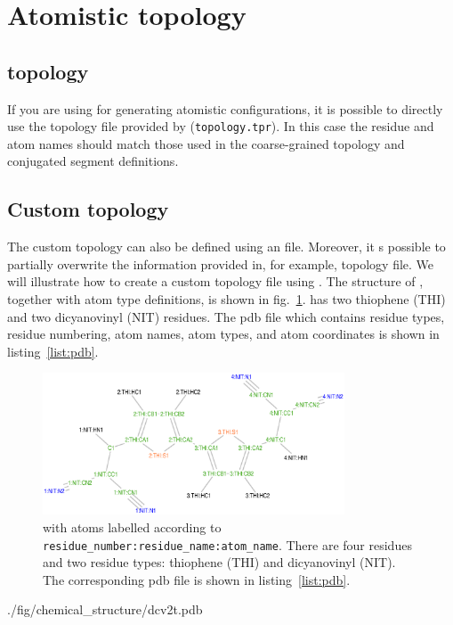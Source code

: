 \section{Atomistic topology}
\label{sec:atomistic}
\subsection{\gromacs topology}
If you are using \gromacs for generating atomistic configurations, it is possible to directly use the topology file provided by \gromacs (\texttt{topology.tpr}). In this case the residue and atom names should match those used  in the coarse-grained topology and conjugated segment definitions. 

\subsection{Custom topology}
The custom topology can also be defined using an \xml file. Moreover, it s possible to partially overwrite the information provided in, for example, \gromacs topology file. We will illustrate how to create a custom topology file using \dcvt. The structure of \dcvt, together with atom type definitions, is shown in fig.~\ref{fig:dcv2t_at}. \dcvt has two thiophene (THI) and two dicyanovinyl (NIT) residues. The pdb file which contains residue types, residue numbering, atom names, atom types, and atom coordinates is shown in listing~\ref{list:pdb}.

\clearpage
\begin{figure}[ht]
\centering
\includegraphics[width=0.8\textwidth]{./fig/chemical_structure/dcv2t_atom_types}
\caption{\small \dcvt with atoms labelled according to \texttt{residue\_number:residue\_name:atom\_name}. There are four residues and two residue types: thiophene (THI) and dicyanovinyl (NIT). The corresponding pdb file is shown in listing~\ref{list:pdb}.}
\label{fig:dcv2t_at}
\end{figure}

%
{./fig/chemical_structure/dcv2t.pdb}
\clearpage
